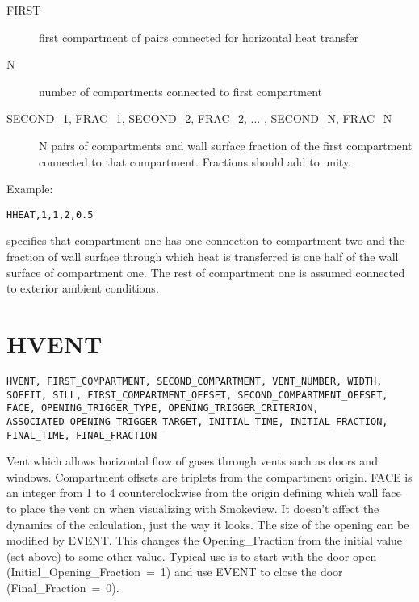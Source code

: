 \begin{adjustwidth}{1cm}{0cm}
\begin{description}
  \item[FIRST] first compartment of pairs connected for horizontal heat transfer
  \item[N] number of compartments connected to first compartment
  \item[SECOND\_1, FRAC\_1, SECOND\_2, FRAC\_2, ... ,  SECOND\_N, FRAC\_N] N pairs of compartments and wall surface fraction of the first compartment connected to that compartment. Fractions should add to unity.
\end{description}
\end{adjustwidth}

\noindent Example:

\begin{lstlisting}
HHEAT,1,1,2,0.5
\end{lstlisting}
specifies that compartment one has one connection to compartment two and the fraction of wall surface through which heat is transferred is one half of the wall surface of compartment one. The rest of compartment one is assumed connected to exterior ambient conditions.

\section{HVENT}

\begin{lstlisting}
HVENT, FIRST_COMPARTMENT, SECOND_COMPARTMENT, VENT_NUMBER, WIDTH, SOFFIT, SILL, FIRST_COMPARTMENT_OFFSET, SECOND_COMPARTMENT_OFFSET, FACE, OPENING_TRIGGER_TYPE, OPENING_TRIGGER_CRITERION, ASSOCIATED_OPENING_TRIGGER_TARGET, INITIAL_TIME, INITIAL_FRACTION, FINAL_TIME, FINAL_FRACTION
\end{lstlisting}

Vent which allows horizontal flow of gases through vents such as doors and windows. Compartment offsets are triplets from the compartment origin.  FACE is an integer from 1 to 4 counterclockwise from the origin defining which wall face to place the vent on when visualizing with Smokeview. It doesn't affect the dynamics of the calculation, just the way it looks. The size of the opening can be modified by EVENT. This changes the Opening\_Fraction from the initial value (set above) to some other value. Typical use is to start with the door open (Initial\_Opening\_Fraction~=~1) and use EVENT to close the door (Final\_Fraction~=~0).

